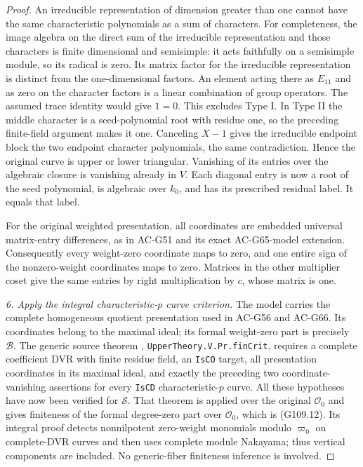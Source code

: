 \begin{proof}
An irreducible representation of dimension greater than one
cannot have the same characteristic polynomials as a sum of
characters.  For completeness, the image algebra on the direct
sum of the irreducible representation and those characters is
finite dimensional and semisimple: it acts faithfully on a
semisimple module, so its radical is zero.  Its matrix factor
for the irreducible representation is distinct from the
one-dimensional factors.  An element acting there as \(E_{11}\)
and as zero on the character factors is a linear combination
of group operators.  The assumed trace identity would give
\(1=0\).  This excludes Type I.
In Type II the middle character is a seed-polynomial root
with residue one, so the preceding finite-field argument makes
it one.  Canceling \(X-1\) gives the irreducible endpoint block
the two endpoint character polynomials, the same contradiction.
Hence the original curve is upper or lower triangular.
Vanishing of its entries over the algebraic closure is
vanishing already in \(V\).  Each diagonal entry is now a
root of the seed polynomial, is algebraic over \(k_0\), and
has its prescribed residual label.  It equals that label.

For the original weighted presentation, all coordinates are
embedded universal matrix-entry differences, as in AC-G51
and its exact AC-G65-model extension.  Consequently every
weight-zero coordinate maps to zero, and one entire sign
of the nonzero-weight coordinates maps to zero.  Matrices
in the other multiplier coset give the same entries by right
multiplication by \(c\), whose matrix is one.

\emph{6. Apply the integral characteristic-\(p\) curve criterion.}
The model carries the complete homogeneous quotient
presentation used in AC-G56 and AC-G66.  Its coordinates
belong to the maximal ideal; its formal weight-zero part
is precisely \(\mathscr B\).  The generic source theorem
,
\texttt{UpperTheory.V.Pr.finCrit}, requires a complete
coefficient DVR with finite residue field, an \texttt{IsCO}
target, all presentation coordinates in its maximal ideal,
and exactly the preceding two coordinate-vanishing assertions
for every \texttt{IsCD} characteristic-\(p\) curve.
All these hypotheses have now been verified for \(\mathscr S\).
That theorem is applied over the original \(\mathcal O_0\)
and gives finiteness of the formal degree-zero part over
\(\mathcal O_0\), which is (G109.12).
Its integral proof detects nonnilpotent zero-weight monomials
modulo \(\varpi_0\) on complete-DVR curves and then uses complete
module Nakayama; thus vertical components are included.
No generic-fiber finiteness inference is involved.
\end{proof}


